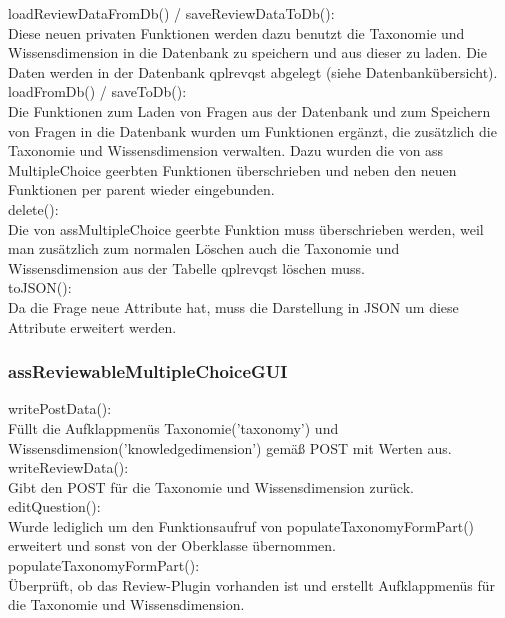 \documentclass[a4paper]{scrreprt}
\begin{document}
loadReviewDataFromDb() / saveReviewDataToDb():\\
Diese neuen privaten Funktionen werden dazu benutzt die Taxonomie und Wissensdimension in die Datenbank zu speichern und aus dieser zu laden.
Die Daten werden in der Datenbank qpl\textunderscore rev\textunderscore qst abgelegt (siehe Datenbankübersicht). \\

loadFromDb() / saveToDb():\\
Die Funktionen zum Laden von Fragen aus der Datenbank und zum Speichern von Fragen in die Datenbank wurden um Funktionen ergänzt, 
die zusätzlich die Taxonomie und Wissensdimension verwalten. 
Dazu wurden die von ass MultipleChoice geerbten Funktionen überschrieben und neben den neuen Funktionen per parent wieder eingebunden.\\

delete():\\
Die von assMultipleChoice geerbte Funktion muss überschrieben werden, weil man zusätzlich zum normalen Löschen auch die Taxonomie und Wissensdimension aus der Tabelle qpl\textunderscore rev\textunderscore qst löschen muss.\\

toJSON():\\
Da die Frage neue Attribute hat, muss die Darstellung in JSON um diese Attribute erweitert werden.\\


\subsubsection{assReviewableMultipleChoiceGUI}

writePostData():\\
Füllt die Aufklappmenüs Taxonomie('taxonomy') und Wissensdimension('knowledge\textunderscore dimension') gemäß POST mit Werten aus.\\

writeReviewData():\\
Gibt den POST für die Taxonomie und Wissensdimension zurück.\\

editQuestion():\\
Wurde lediglich um den Funktionsaufruf von populateTaxonomyFormPart() erweitert und sonst von der Oberklasse übernommen.\\

populateTaxonomyFormPart():\\
Überprüft, ob das Review-Plugin vorhanden ist und erstellt Aufklappmenüs für die Taxonomie und Wissensdimension.\\
\end{document}
